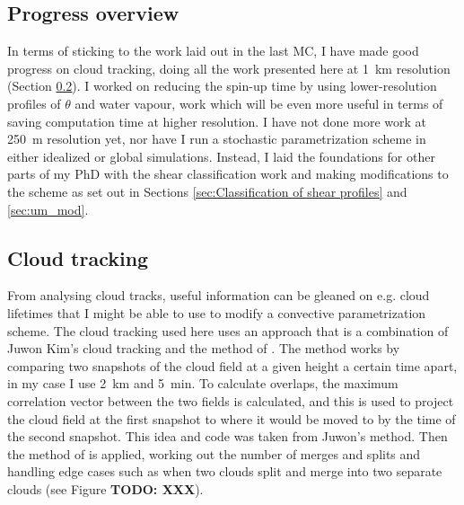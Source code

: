 \documentclass[11pt,a4paper]{article}
\newcommand\todo[1]{\textbf{TODO: #1}}
\begin{document}
\subsection{Progress overview}
\label{sec:Progress overview}

In terms of sticking to the work laid out in the last MC, I have made good progress on cloud tracking, doing all the work presented here at \SI{1}{km} resolution (Section \ref{sec:Cloud tracking}). I worked on reducing the spin-up time by using lower-resolution profiles of $\theta$ and water vapour, work which will be even more useful in terms of saving computation time at higher resolution. I have not done more work at \SI{250}{m} resolution yet, nor have I run a stochastic parametrization scheme in either idealized or global simulations. Instead, I laid the foundations for other parts of my PhD with the shear classification work and making modifications to the \cite{gregory1990mass} scheme as set out in Sections \ref{sec:Classification of shear profiles} and \ref{sec:um_mod}.

\subsection{Cloud tracking}
\label{sec:Cloud tracking}


From analysing cloud tracks, useful information can be gleaned on e.g. cloud lifetimes that I might be able to use to modify a convective parametrization scheme. The cloud tracking used here uses an approach that is a combination of Juwon Kim's cloud tracking and the method of \cite{plant2009statistical}. 
The method works by comparing two snapshots of the cloud field at a given height a certain time apart, in my case I use \SI{2}{km} and \SI{5}{min}. To calculate overlaps, the maximum correlation vector between the two fields is calculated, and this is used to project the cloud field at the first snapshot to where it would be moved to by the time of the second snapshot. This idea and code was taken from Juwon's method. Then the method of \cite{plant2009statistical} is applied, working out the number of merges and splits and handling edge cases such as when two clouds split and merge into two separate clouds (see Figure \todo{XXX}).
\end{document}
